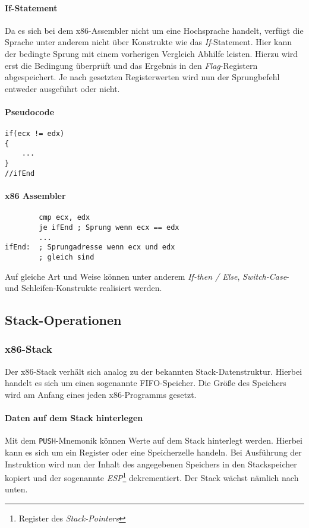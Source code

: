 \paragraph{If-Statement}

Da es sich bei dem x86-Assembler nicht um eine Hochsprache handelt, verfügt die Sprache unter anderem nicht über Konstrukte wie das \textit{If}-Statement.
Hier kann der bedingte Sprung mit einem vorherigen Vergleich Abhilfe leisten.
Hierzu wird erst die Bedingung überprüft und das Ergebnis in den \textit{Flag}-Registern abgespeichert.
Je nach gesetzten Registerwerten wird nun der Sprungbefehl entweder ausgeführt oder nicht.

\paragraph{Pseudocode\newline}\makebox{}
\begin{lstlisting}
if(ecx != edx)
{
    ...
}
//ifEnd
\end{lstlisting}

\paragraph{x86 Assembler\newline}\makebox{}
\begin{lstlisting}
        cmp ecx, edx
        je ifEnd ; Sprung wenn ecx == edx
        ...
ifEnd:  ; Sprungadresse wenn ecx und edx
        ; gleich sind
\end{lstlisting}

Auf gleiche Art und Weise können unter anderem \textit{If-then / Else}, \textit{Switch-Case}- und Schleifen-Konstrukte realisiert werden.


\subsection{Stack-Operationen}
\subsubsection{x86-Stack}
Der x86-Stack verhält sich analog zu der bekannten Stack-Datenstruktur. Hierbei handelt es sich um einen sogenannte FIFO-Speicher.
Die Größe des Speichers wird am Anfang eines jeden x86-Programms gesetzt.

\paragraph{Daten auf dem Stack hinterlegen\newline}
Mit dem \texttt{PUSH}-Mnemonik können Werte auf dem Stack hinterlegt werden.
Hierbei kann es sich um ein Register oder eine Speicherzelle handeln.
Bei Ausführung der Instruktion wird nun der Inhalt des angegebenen Speichers in den Stackspeicher kopiert
und der sogenannte \textit{ESP}\footnote{Register des \textit{Stack-Pointers}} dekrementiert.
Der Stack wächst nämlich nach unten.

